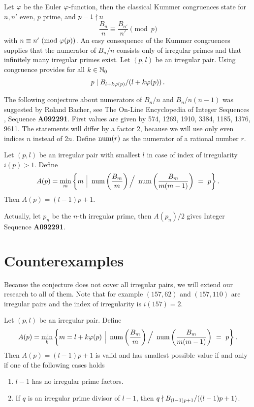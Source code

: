 \documentclass[12pt,english]{article}
\begin{document}
Let $\varphi$ be the Euler $\varphi$-function, then the classical Kummer congruences state
for $n, n'$ even, $p$ prime, and $p-1 \nmid n$
\begin{equation} \label{eqn-kummer-congr}
   \frac{B_n}{n} \equiv \frac{B_{n'}}{n'} \pmod{p}
\end{equation}
with $n \equiv n' \ \mod{\eulerphi(p)}$.
An easy consequence of the Kummer congruences supplies that the numerator of
$B_n/n$ consists only of irregular primes and that infinitely many irregular primes exist.
Let $(p,l)$ be an irregular pair. Using congruence  provides
for all $k \in \mathbb{N}_0$
\begin{equation} \label{eqn-succ-pdiv}
   p \mid B_{l+k\varphi(p)}/(l+k\varphi(p)) \,.
\end{equation}

The following conjecture about numerators of $B_n/n$ and $B_n/n(n-1)$
was suggested by Roland Bacher, see
The On-Line Encyclopedia of Integer Sequences \cite{IntSeq},
Sequence \textbf{A092291}.
First values are given by 574, 1269, 1910, 3384, 1185, 1376, 9611.
The statements will differ by a factor 2,
because we will use only even indices $n$ instead of $2n$.
Define $\mathop{\rm num}\nolimits(r)$ as the numerator of a rational number $r$.

\begin{conj} \label{conj-bern-num}
Let $(p,l)$ be an irregular pair with smallest $l$ in case of index of irregularity $i(p) > 1$.
Define
\[
   A(p) = \min_m \left\{ m \,\,\Big|\,\, \mathop{\rm num}\nolimits\left( \frac{B_m}{m} \right) \Big/ \
            \mathop{\rm num}\nolimits\left( \frac{B_m}{m(m-1)} \right) \ = \ p \right\} .
\]
Then $A(p) = (l-1)p+1$.
\end{conj}

Actually, let $p_n$ be the $n$-th irregular prime, then $A(p_n)/2$ gives
Integer Sequence \textbf{A092291}.

\section{Counterexamples}
\setcounter{equation}{0}

Because the conjecture does not cover all irregular pairs, we will extend our research
to all of them. Note that for example $(157,62)$ and
$(157,110)$ are irregular pairs and the index of irregularity is $i(157)=2$.

\begin{theorem} \label{theor-Ap-small}
Let $(p,l)$ be an irregular pair.
Define
\[
   A(p) = \min_k
     \left\{ m=l+k\varphi(p) \,\,\Big|\,\,
        \mathop{\rm num}\nolimits\left( \frac{B_m}{m} \right) \Big/ \
           \mathop{\rm num}\nolimits\left( \frac{B_m}{m(m-1)} \right) \ = \ p \right\} .
\]
Then $A(p) = (l-1)p+1$ is valid and has smallest possible value
if and only if one of the following cases holds
\begin{enumerate}
\item $l-1$ has no irregular prime factors.
\item If $q$ is an irregular prime divisor of $l-1$, then $q \nmid B_{(l-1)p+1}/((l-1)p+1)$.
\end{enumerate}
\end{theorem}
\end{document}
